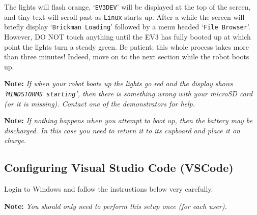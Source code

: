 \documentclass[hidelinks,a4paper,11pt]{article}
\begin{document}
The lights will flash orange, `\texttt{EV3DEV}' will be displayed at the top of the screen, and tiny text will scroll past as \texttt{Linux} starts up.  After a while the screen will briefly display `\texttt{Brickman Loading}' followed by a menu headed `\texttt{File Browser}'.  However, {\color {red} DO NOT} touch anything until the EV3 has fully booted up at which point the lights turn a steady green.  Be patient; this whole process takes more than three minutes!  Indeed, move on to the next section while the robot boots up.

{\bfseries Note:}  \emph{If when your robot boots up the lights go red and the display shows `\texttt{MINDSTORMS starting}', then there is something wrong with your microSD card (or it is missing).  Contact one of the demonstrators for help.}

{\bfseries Note:}  \emph{If nothing happens when you attempt to boot up, then the battery may be discharged.  In this case you need to return it to its cupboard and place it on charge.}


\subsection{Configuring Visual Studio Code (VSCode)}

Login to Windows and follow the instructions below very carefully.

{\bfseries Note:}  \emph{You should only need to perform this setup once (for each user).}
\end{document}
